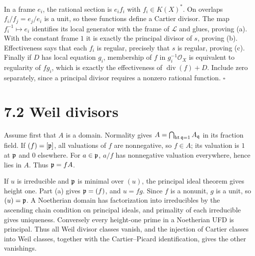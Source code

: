 \documentclass[11pt]{article}
\let\chapterexercise\exercise
\renewcommand{\exercise}[2]{\Needspace{8\baselineskip}\chapterexercise{#1}{#2}}
\begin{document}
\pf
In a frame $e_i$, the rational section is $e_if_i$ with $f_i\in K(X)^*$. On overlaps $f_i/f_j=e_j/e_i$ is a unit, so these functions define a Cartier divisor. The map $f_i^{-1}\mapsto e_i$ identifies its local generator with the frame of $\mathcal L$ and glues, proving (a). With the constant frame $1$ it is exactly the principal divisor of $s$, proving (b). Effectiveness says that each $f_i$ is regular, precisely that $s$ is regular, proving (c). Finally if $D$ has local equation $g_i$, membership of $f$ in $g_i^{-1}\mathcal O_X$ is equivalent to regularity of $fg_i$, which is exactly the effectiveness of $\operatorname{div}(f)+D$. Include zero separately, since a principal divisor requires a nonzero rational function. \hfill$\square$

\section*{7.2 Weil divisors}

\pf
Assume first that $A$ is a domain. Normality gives $A=\bigcap_{\operatorname{ht}\mathfrak q=1}A_\mathfrak q$ in its fraction field. If $(f)=[\mathfrak p]$, all valuations of $f$ are nonnegative, so $f\in A$; its valuation is $1$ at $\mathfrak p$ and $0$ elsewhere. For $a\in\mathfrak p$, $a/f$ has nonnegative valuation everywhere, hence lies in $A$. Thus $\mathfrak p=fA$.

If $u$ is irreducible and $\mathfrak p$ is minimal over $(u)$, the principal ideal theorem gives height one. Part (a) gives $\mathfrak p=(f)$, and $u=fg$. Since $f$ is a nonunit, $g$ is a unit, so $(u)=\mathfrak p$. A Noetherian domain has factorization into irreducibles by the ascending chain condition on principal ideals, and primality of each irreducible gives uniqueness. Conversely every height-one prime in a Noetherian UFD is principal. Thus all Weil divisor classes vanish, and the injection of Cartier classes into Weil classes, together with the Cartier--Picard identification, gives the other vanishings.
\end{document}
